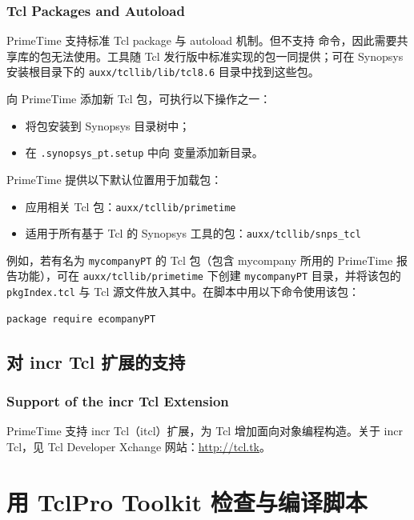 \subsubsection*{Tcl Packages and Autoload}

PrimeTime 支持标准 Tcl package 与 autoload 机制。但不支持  命令，因此需要共享库的包无法使用。工具随 Tcl 发行版中标准实现的包一同提供；可在 Synopsys 安装根目录下的 \texttt{auxx/tcllib/lib/tcl8.6} 目录中找到这些包。

向 PrimeTime 添加新 Tcl 包，可执行以下操作之一：
\begin{itemize}
  \item 将包安装到 Synopsys 目录树中；
  \item 在 \texttt{.synopsys\_pt.setup} 中向  变量添加新目录。
\end{itemize}

PrimeTime 提供以下默认位置用于加载包：
\begin{itemize}
  \item 应用相关 Tcl 包：\texttt{auxx/tcllib/primetime}
  \item 适用于所有基于 Tcl 的 Synopsys 工具的包：\texttt{auxx/tcllib/snps\_tcl}
\end{itemize}

例如，若有名为 \texttt{mycompanyPT} 的 Tcl 包（包含 mycompany 所用的 PrimeTime 报告功能），可在 \texttt{auxx/tcllib/primetime} 下创建 \texttt{mycompanyPT} 目录，并将该包的 \texttt{pkgIndex.tcl} 与 Tcl 源文件放入其中。在脚本中用以下命令使用该包：
\begin{lstlisting}
package require ecompanyPT
\end{lstlisting}

\subsection{对 incr Tcl 扩展的支持}
\subsubsection*{Support of the incr Tcl Extension}

PrimeTime 支持 incr Tcl（itcl）扩展，为 Tcl 增加面向对象编程构造。关于 incr Tcl，见 Tcl Developer Xchange 网站：\url{http://tcl.tk}。

\section{用 TclPro Toolkit 检查与编译脚本}

